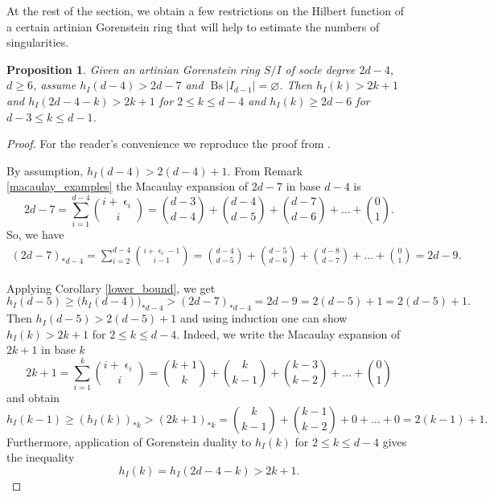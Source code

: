 \documentclass[a4paper,11pt,english,german]{amsart}
\DeclareMathOperator{\Bs}{Bs}
\DeclareMathOperator{\eps}{\epsilon}
\newtheorem{prop}[thm]{Proposition}
\theoremstyle{definition}
\begin{document}
At the rest of the section, we obtain a few restrictions on the Hilbert function of a certain artinian Gorenstein ring that will help to estimate the numbers of singularities.

 \begin{prop} \label{old}
 	Given an artinian Gorenstein ring $S/I$ of socle degree $2d-4$, $d\geqslant 6$, assume $h_I(d-4)>2d-7$ and $\Bs|I_{d-1}|=\varnothing$. Then $h_I(k)>2k+1$ and $h_I(2d-4-k)>2k+1$ for $2\leqslant k \leqslant d-4$ and $h_I(k)\geqslant 2d-6$ for $d-3 \leqslant k \leqslant d-1$.
 \end{prop}
\begin{proof}
For the reader's convenience	 we reproduce the proof from \cite[Lemma 5.4]{kloosterman2022maximal}. 

By assumption, $h_I(d-4)> 2(d-4)+1$. From Remark \ref{macaulay_examples} the Macaulay expansion of $2d-7$ in base $d-4$ is
$$2d-7 = \sum\limits_{i=1}^{d-4}\binom{i+\eps_i}{i}=\binom{d-3}{d-4}+\binom{d-4}{d-5}+\binom{d-7}{d-6}+\dots+\binom{0}{1}.$$
So, we have 
\begin{multline*}
	(2d-7)_{\ast d-4}=\sum\limits_{i=2}^{d-4}\binom{i+\eps_i-1}{i-1}
	=\binom{d-4}{d-5}+\binom{d-5}{d-6}+\binom{d-8}{d-7}+\dots+\binom{0}{1}=2d-9.
\end{multline*}

Applying Corollary \ref{lower_bound}, we get
$$h_I(d-5)\geqslant \big(h_I(d-4)\big)_{\ast d-4}> (2d-7)_{\ast d-4}=2d-9=2(d-5)+1 =2(d-5)+1.$$ 
Then $h_I(d-5)>2(d-5)+1$ and using induction one can show $h_I(k)>2k+1$ for $2\leqslant k \leqslant d-4$. Indeed, we write the Macaulay expansion of $2k+1$ in base $k$
$$
2k+1=\sum\limits_{i=1}^k \binom{i+\eps_i}{i}=\binom{k+1}{k}+\binom{k}{k-1}+\binom{k-3}{k-2}+\dots+\binom{0}{1}
$$
and obtain
$$
h_I(k-1)\geqslant ( h_I(k) )_{\ast k}>(2k+1)_{\ast k}=\binom{k}{k-1}+\binom{k-1}{k-2}+0+\dots+0=2(k-1)+1.
$$
Furthermore, application of Gorenstein duality to $h_I(k)$ for  $2\leqslant k \leqslant d-4$ gives the inequality 
$$
h_I(k)=h_I(2d-4-k)>2k+1.$$


\end{proof}
\end{document}
